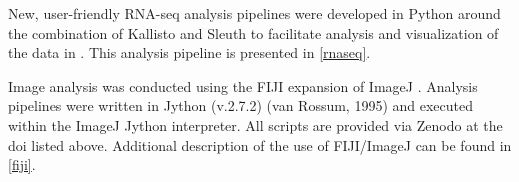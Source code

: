 New, user\hyp{}friendly RNA\hyp{}seq analysis pipelines were developed in Python around the combination of Kallisto \citep{Bray2016} and Sleuth \citep{Pimentel2017} to facilitate analysis and visualization of the data in \citet{Saelens2022}. This analysis pipeline is presented in \autoref{rnaseq}.

Image analysis was conducted using the FIJI \citep{Schindelin2012, Rueden2017} expansion of ImageJ \citep{Schneider2012}. Analysis pipelines were written in Jython (v.2.7.2) (van Rossum, 1995) and executed within the ImageJ Jython interpreter. All scripts are provided via Zenodo at the doi listed above. Additional description of the use of FIJI/ImageJ can be found in \autoref{fiji}.

